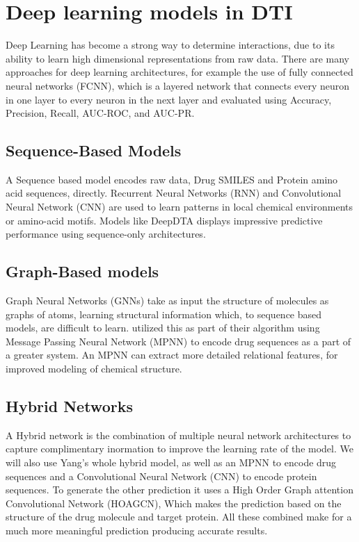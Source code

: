 \section{Deep learning models in DTI}
Deep Learning has become a strong way to determine interactions, due to its ability to learn high dimensional representations from raw data. There are many approaches for deep learning architectures, for example the use of fully connected neural networks (FCNN), \citep{Talukder2025}\citep{Zhan2025} which is a layered network that connects every neuron in one layer to every neuron in the next layer and evaluated using Accuracy, Precision, Recall, AUC-ROC, and AUC-PR.

\subsection{Sequence-Based Models}
A Sequence based model encodes raw data, Drug SMILES and Protein amino acid sequences, directly. Recurrent Neural Networks (RNN) and Convolutional Neural Network (CNN) are used to learn patterns in local chemical environments or amino-acid motifs. Models like DeepDTA \citep{Ozturk2018} displays impressive predictive performance using sequence-only architectures.

\subsection{Graph-Based models}
Graph Neural Networks (GNNs) take as input the structure of molecules as graphs of atoms, learning structural information which, to sequence based models, are difficult to learn. \citep{Yang2024} utilized this as part of their algorithm using Message Passing Neural Network (MPNN) to encode drug sequences as a part of a greater system. An MPNN can extract more detailed relational features, for improved modeling of chemical structure.

\subsection{Hybrid Networks} 
A Hybrid network is the combination of multiple neural network architectures to capture complimentary inormation to improve the learning rate of the model. We will also use Yang's \citep{Yang2024} whole hybrid model, as well as an MPNN to encode drug sequences and a Convolutional Neural Network (CNN) to encode protein sequences. To generate the other prediction it uses a High Order Graph attention Convolutional Network (HOAGCN), Which makes the prediction based on the structure of the drug molecule and target protein. All these combined make for a much more meaningful prediction producing accurate results.


